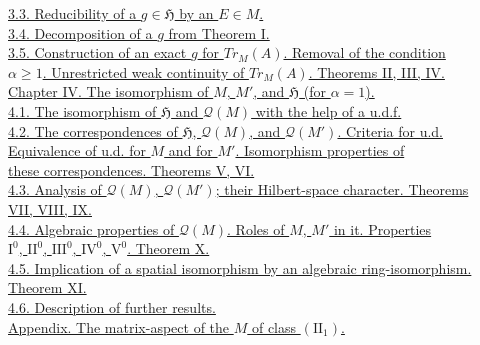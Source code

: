 \documentclass[twoside,leqno]{article}
\newcommand{\TrM}{Tr_M}
\newcommand{\cH}{\mathfrak{H}}
\newcommand{\Q}{\mathcal{Q}}
\begin{document}
\hspace*{2em}\hyperlink{sec:3.3}{3.3. Reducibility of a $g\in\cH$ by an $E\in M$.}\\
\hspace*{2em}\hyperlink{sec:3.4}{3.4. Decomposition of a $g$ from Theorem I.}\\
\hspace*{2em}\hyperlink{sec:3.5}{3.5. Construction of an exact $g$ for $\TrM(A)$. Removal of the condition}\\
\hspace*{4em}\hyperlink{sec:3.5}{$\alpha\geq1$. Unrestricted weak continuity of $\TrM(A)$. Theorems II, III, IV.}\\
\hyperlink{chap:IV}{Chapter IV. The isomorphism of $M$, $M'$, and $\cH$ (for $\alpha=1$).}\\
\hspace*{2em}\hyperlink{sec:4.1}{4.1. The isomorphism of $\cH$ and $\Q(M)$ with the help of a u.d.f.}\\
\hspace*{2em}\hyperlink{sec:4.2}{4.2. The correspondences of $\cH$, $\Q(M)$, and $\Q(M')$. Criteria for u.d.}\\
\hspace*{4em}\hyperlink{sec:4.2}{Equivalence of u.d. for $M$ and for $M'$. Isomorphism properties of}\\
\hspace*{4em}\hyperlink{sec:4.2}{these correspondences. Theorems V, VI.}\\
\hspace*{2em}\hyperlink{sec:4.3}{4.3. Analysis of $\Q(M)$, $\Q(M')$; their Hilbert-space character. Theorems}\\
\hspace*{4em}\hyperlink{sec:4.3}{VII, VIII, IX.}\\
\hspace*{2em}\hyperlink{sec:4.4}{4.4. Algebraic properties of $\Q(M)$. Roles of $M$, $M'$ in it. Properties}\\
\hspace*{4em}\hyperlink{sec:4.4}{$\mathrm I^0$, $\mathrm{II}^0$, $\mathrm{III}^0$, $\mathrm{IV}^0$, $\mathrm V^0$. Theorem X.}\\
\hspace*{2em}\hyperlink{sec:4.5}{4.5. Implication of a spatial isomorphism by an algebraic ring-isomorphism.}\\
\hspace*{4em}\hyperlink{sec:4.5}{Theorem XI.}\\
\hspace*{2em}\hyperlink{sec:4.6}{4.6. Description of further results.}\\
\hyperlink{chap:Appendix}{Appendix. The matrix-aspect of the $M$ of class $(\mathrm{II}_1)$.}
\end{document}
